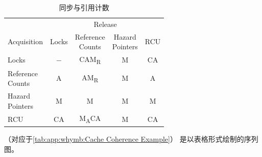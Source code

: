 \begin{table}
\renewcommand*{\arraystretch}{1.25}
\small
\centering
\begin{tabular}{lcccc}
	\toprule
	& \multicolumn{4}{c}{Release} \\
	\cmidrule(l){2-5}
	Acquisition	& Locks
				& \parbox[c]{.5in}{Reference\\Counts}
					& \parbox[c]{.5in}{Hazard\\Pointers}
						& RCU \\
	 \cmidrule(l){2-5}
	Locks		& $-$	& CAM\textsubscript{R}	& M	& CA  \\
	\parbox[c][6ex]{.6in}{Reference\\Counts}
			& A	& AM\textsubscript{R}    & M	& A   \\
	\parbox[c][6ex]{.6in}{Hazard\\Pointers}
			& M	& M	& M	& M   \\
	RCU		& CA	& M\textsubscript{A}CA	& M	& CA  \\
	\bottomrule
\end{tabular}

\vspace{5pt}\hfill
{}
\caption{同步与引用计数}
\label{tab:app:styleguide:Synchronization and Reference Counting}
\end{table}

（对应于\cref{tab:app:whymb:Cache Coherence Example}）
是以表格形式绘制的序列图。

